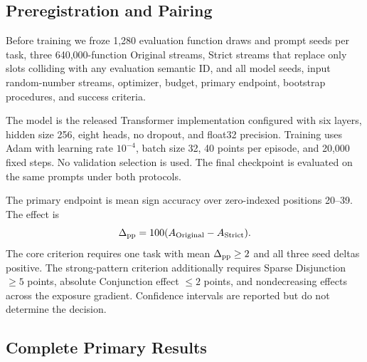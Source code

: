 \subsection{Preregistration and Pairing}

Before training we froze 1,280 evaluation function draws and prompt seeds per
task, three 640,000-function Original streams, Strict streams that replace
only slots colliding with any evaluation semantic ID, and all model seeds,
input random-number streams, optimizer, budget, primary endpoint, bootstrap
procedures, and success criteria.

The model is the released Transformer implementation configured with six
layers, hidden size 256, eight heads, no dropout, and float32 precision.
Training uses Adam with learning rate $10^{-4}$, batch size 32, 40 points per
episode, and 20,000 fixed steps.  No validation selection is used.  The final
checkpoint is evaluated on the same prompts under both protocols.

The primary endpoint is mean sign accuracy over zero-indexed positions
20--39.  The effect is
\begin{equation}
\Delta_{\rm pp}=100(A_{\rm Original}-A_{\rm Strict}).
\end{equation}
The core criterion requires one task with mean $\Delta_{\rm pp}\geq2$ and all three seed
deltas positive.  The strong-pattern criterion additionally requires Sparse Disjunction
$\geq5$ points, absolute Conjunction effect $\leq2$ points, and nondecreasing
effects across the exposure gradient.  Confidence intervals are reported but
do not determine the decision.

\subsection{Complete Primary Results}

